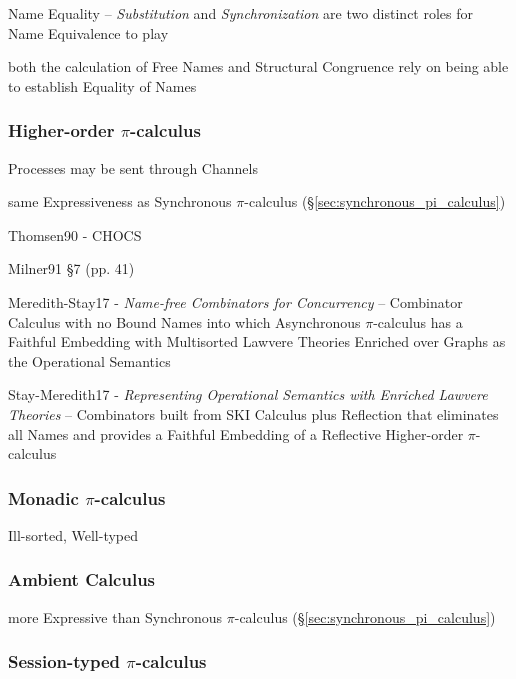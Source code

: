 Name Equality -- \emph{Substitution} and \emph{Synchronization} are two distinct
roles for Name Equivalence to play

both the calculation of Free Names and Structural Congruence rely on being able
to establish Equality of Names



\subsubsection{Higher-order $\pi$-calculus}\label{sec:higherorder_pi_calculus}

Processes may be sent through Channels

same Expressiveness as Synchronous $\pi$-calculus
(\S\ref{sec:synchronous_pi_calculus})

Thomsen90 - CHOCS

Milner91 \S 7 (pp. 41)

Meredith-Stay17 - \emph{Name-free Combinators for Concurrency} --
Combinator Calculus with no Bound Names into which Asynchronous
$\pi$-calculus has a Faithful Embedding with Multisorted Lawvere
Theories Enriched over Graphs as the Operational Semantics

Stay-Meredith17 - \emph{Representing Operational Semantics with
  Enriched Lawvere Theories} -- Combinators built from SKI Calculus
plus Reflection that eliminates all Names and provides a Faithful
Embedding of a Reflective Higher-order $\pi$-calculus



\subsubsection{Monadic $\pi$-calculus}\label{sec:monadic_pi_calculus}

Ill-sorted, Well-typed %



\subsubsection{Ambient Calculus}\label{sec:ambient_calculus}

more Expressive than Synchronous $\pi$-calculus
(\S\ref{sec:synchronous_pi_calculus})



\subsubsection{Session-typed $\pi$-calculus}
\label{sec:sessiontyped_pi}
\cite{honda-vasconcelos-kubo98}
\cite{caires-pfenning10}
\cite{caires-pfenning-toninho12}

